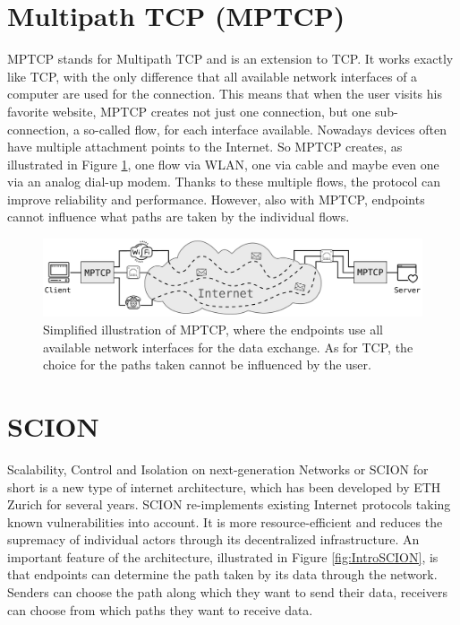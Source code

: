 \section{Multipath TCP (MPTCP)}

MPTCP stands for Multipath TCP and is an extension to TCP. It works exactly like TCP, with the only difference that all available network interfaces of a computer are used for the connection. This means that when the user visits his favorite website, MPTCP creates not just one connection, but one sub-connection, a so-called flow, for each interface available. Nowadays devices often have multiple attachment points to the Internet. So MPTCP creates, as illustrated in Figure \ref{fig:IntroMPTCP}, one flow via WLAN, one via cable and maybe even one via an analog dial-up modem. Thanks to these multiple flows, the protocol can improve reliability and performance. However, also with MPTCP, endpoints cannot influence what paths are taken by the individual flows. 

\begin{figure}[H]
	\begin{center}
		\def\svgwidth{1\textwidth}
		\includegraphics[scale=0.28]{../illustrations/introduction/MPTCPConnection.pdf}    
		\caption[Caption for the list of figures.]{Simplified illustration of MPTCP, where the endpoints use all available network interfaces for the data exchange. As for TCP, the choice for the paths taken cannot be influenced by the user.}
		\label{fig:IntroMPTCP}
	\end{center}
\end{figure}

\section{SCION}

Scalability, Control and Isolation on next-generation Networks or SCION for short is a new type of internet architecture, which has been developed by ETH Zurich for several years. SCION re-implements existing Internet protocols taking known vulnerabilities into account. It is more resource-efficient and reduces the supremacy of individual actors through its decentralized infrastructure. An important feature of the architecture, illustrated in Figure \ref{fig:IntroSCION}, is that endpoints can determine the path taken by its data through the network. Senders can choose the path along which they want to send their data, receivers can choose from which paths they want to receive data.


